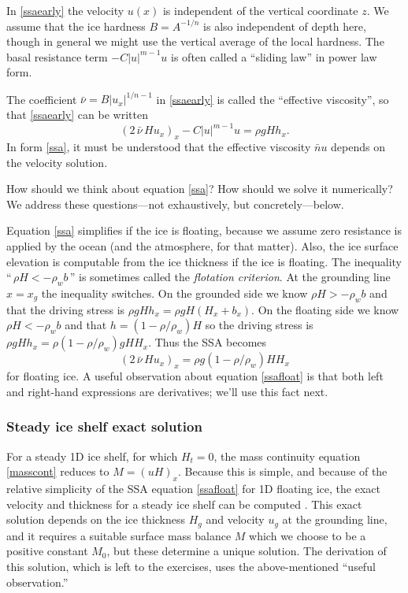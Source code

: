 \documentclass[titlepage,letterpaper,final,12pt]{scrartcl}
\begin{document}
In \eqref{ssaearly} the velocity $u(x)$ is independent of the vertical coordinate $z$.  We assume that the ice hardness $B=A^{-1/n}$ is also independent of depth here, though in general we might use the vertical average of the local hardness.  The basal resistance term $- C|u|^{m-1}u$ is often called a ``sliding law'' in power law form.

The coefficient $\bar \nu = B |u_x|^{1/n-1}$ in \eqref{ssaearly} is called the ``effective viscosity'', so that \eqref{ssaearly} can be written
\begin{equation}
  \left(2 \,\bar \nu\, H u_x\right)_x - C |u|^{m-1} u = \rho g H h_x.  \label{ssa}
\end{equation}
In form \eqref{ssa}, it must be understood that the effective viscosity $\bar nu$ depends on the velocity solution.

How should we think about equation \eqref{ssa}?  How should we solve it numerically?  We address these questions---not exhaustively, but concretely---below.

Equation \eqref{ssa} simplifies if the ice is floating, because we assume zero resistance is applied by the ocean (and the atmosphere, for that matter).  Also, the ice surface elevation is computable from the ice thickness if the ice is floating.  The inequality ``$\,\rho H < - \rho_w b\,$'' is sometimes called the \emph{flotation criterion}.  At the grounding line $x=x_g$ the inequality switches.  On the grounded side we know $\rho H > - \rho_w b$ and that the driving stress is $\rho g H h_x = \rho g H (H_x + b_x)$.  On the floating side we know $\rho H < - \rho_w b$ and that $h = (1-\rho/\rho_w) H$ so the driving stress is $\rho g H h_x = \rho(1-\rho/\rho_w) g H H_x$.  Thus the SSA becomes
\begin{equation}
   \left(2 \,\bar\nu\, H u_x\right)_x = \rho g (1-\rho/\rho_w) H H_x \label{ssafloat}
\end{equation}
for floating ice.  A useful observation about equation \eqref{ssafloat} is that both left and right-hand expressions are derivatives; we'll use this fact next.

\subsubsection*{Steady ice shelf exact solution}  For a steady 1D ice shelf, for which $H_t=0$, the mass continuity equation \eqref{masscont} reduces to $M=(uH)_x$.  Because this is simple, and because of the relative simplicity of the SSA equation \eqref{ssafloat} for 1D floating ice, the exact velocity and thickness for a steady ice shelf can be computed \cite{vanderVeen83}.  This exact solution depends on the ice thickness $H_g$ and velocity $u_g$ at the grounding line, and it requires a suitable surface mass balance $M$ which we choose to be a positive constant $M_0$, but these determine a unique solution.  The derivation of this solution, which is left to the exercises, uses the above-mentioned ``useful observation.''
\end{document}
